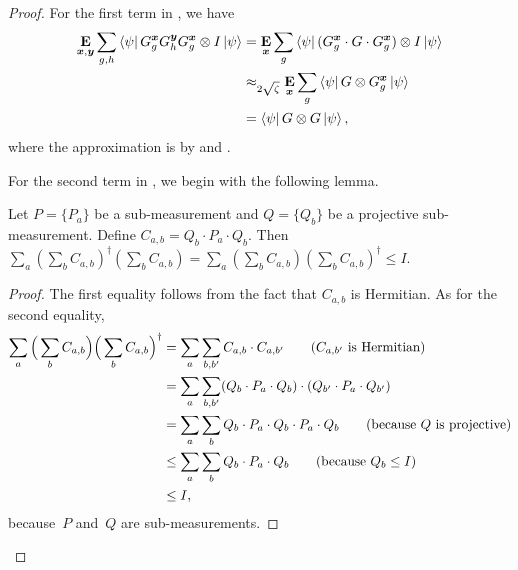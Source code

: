 \begin{proof}
  For the first term in , we have
  \begin{align*}
   \mathop{\bf E\/}_{{\boldsymbol{x}}, \boldsymbol{y}} \sum_{g,h} \bra{\psi} G^{\boldsymbol{x}}_g G^{\boldsymbol{y}}_h
      G^{{\boldsymbol{x}}}_g \otimes I \ket{\psi}&= \mathop{\bf E\/}_{{\boldsymbol{x}}} \sum_{g}
                                \bra{\psi}( G^{{\boldsymbol{x}}}_g\cdot G\cdot G^{{\boldsymbol{x}}}_g) \otimes I \ket{\psi}
    \\
    &\approx_{2\sqrt{\zeta}} \mathop{\bf E\/}_{{\boldsymbol{x}}}\sum_g \bra{\psi}
      G \otimes G^{{\boldsymbol{x}}}_g \ket{\psi} \\
     &= \bra{\psi} G \otimes G \ket{\psi}, 
  \end{align*}
  where the approximation is by  and .
  
  
  For the second term in , we begin with the following lemma.
  \begin{lemma}\label{lem:normalization-condition}
  Let $P = \{P_a\}$ be a sub-measurement and $Q = \{Q_b\}$ be a projective sub-measurement.
  Define $C_{a, b} = Q_b \cdot P_a \cdot Q_b$. 
  Then
  $
  \sum_a (\sum_b C_{a, b})^\dagger (\sum_b C_{a, b}) = \sum_a (\sum_b C_{a, b}) (\sum_b C_{a, b})^\dagger \leq I.
  $
  \end{lemma}
  \begin{proof}
  The first equality follows from the fact that $C_{a, b}$ is Hermitian.
  As for the second equality,
  \begin{align*}
  \sum_a \Big(\sum_b C_{a, b}\Big) \Big(\sum_b C_{a, b}\Big)^\dagger
  &= \sum_a \sum_{b, b'} C_{a, b} \cdot C_{a, b'}\tag{$C_{a, b'}$ is Hermitian}\\
  &= \sum_a \sum_{b, b'} (Q_b \cdot P_a \cdot Q_b) \cdot (Q_{b'} \cdot P_a \cdot Q_{b'})\\
  &= \sum_a \sum_{b} Q_b \cdot P_a \cdot Q_b \cdot P_a \cdot Q_{b}\tag{because $Q$ is projective}\\
  &\leq \sum_a \sum_{b} Q_b \cdot P_a  \cdot Q_{b}\tag{because $Q_b \leq I$}\\
  &\leq I,
  \end{align*}
  because~$P$ and~$Q$ are sub-measurements.
  \end{proof}
  

\end{proof}
